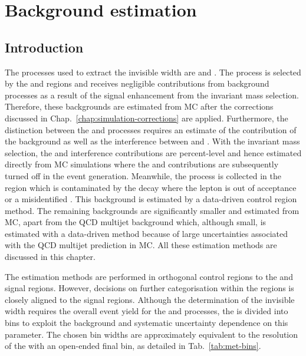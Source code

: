 \chapter{Background estimation}
\label{chap:backgrounds}


\section{Introduction}

The processes used to extract the \PZ invisible width are \IZvv and \IZll. The \IZll process is selected by the \dimuplusjets and \dieleplusjets regions and receives negligible contributions from background processes as a result of the signal enhancement from the invariant mass selection. Therefore, these backgrounds are estimated from MC after the corrections discussed in Chap.~\ref{chap:simulation-corrections} are applied. Furthermore, the distinction between the \IDYll and \IZll processes requires an estimate of the contribution of the \Pgstar background as well as the interference between \PZ and \Pgstar. With the invariant mass selection, the \Pgstar and interference contributions are percent-level and hence estimated directly from MC simulations where the \PZ and \Pgstar contributions are subsequently turned off in the event generation. Meanwhile, the \IZvv process is collected in the \metplusjets region which is contaminated by the \IWlv decay where the lepton is out of acceptance or a misidentified \Ptauh.  This \IWlv background is estimated by a data-driven control region method. The remaining backgrounds are significantly smaller and estimated from MC, apart from the QCD multijet background which, although small, is estimated with a data-driven method because of large uncertainties associated with the QCD multijet prediction in MC. All these estimation methods are discussed in this chapter.

The estimation methods are performed in orthogonal control regions to the \metplusjets and \diellplusjets signal regions. However, decisions on further categorisation within the regions is closely aligned to the signal regions.  Although the determination of the \PZ invisible width requires the overall event yield for the \IZvv and \IZll processes, the \recoil is divided into bins to exploit the background and systematic uncertainty dependence on this parameter. The chosen bin widths are approximately equivalent to the resolution of the \recoil with an open-ended final bin, as detailed in Tab.~\ref{tab:met-bins}.

